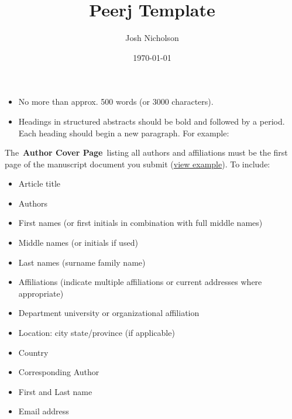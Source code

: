 \documentclass[10pt]{article}
\renewenvironment{abstract}
  {{\bfseries\noindent{\abstractname}\par\nobreak}\footnotesize}
  {\bigskip}
\providecommand{\tightlist}{\setlength{\itemsep}{0pt}\setlength{\parskip}{0pt}}%
\begin{document}
\title{Peerj Template}



\author[1]{Josh Nicholson}%
%


\vspace{-1em}



  \date{\today}


\begingroup
\let\center\flushleft
\let\endcenter\endflushleft
\maketitle
\endgroup





\begin{abstract}
\par\null

\begin{itemize}
\tightlist
\item
  No more than approx. 500 words (or 3000 characters).
\item
  Headings in structured abstracts should be bold and followed by a
  period. Each heading should begin a new paragraph. For example:
\end{itemize}%
\end{abstract}%



\sloppy


The~\textbf{Author Cover Page}~listing all authors and affiliations must
be the first page of the manuscript document you submit
(\href{https://peerj.com/about/author-instructions/\#author-cover-page-modal}{view
example}). To include:

\begin{itemize}
\tightlist
\item
  Article title
\item
  Authors
\item
  First names (or first initials in combination with full middle names)
\item
  Middle names (or initials if used)
\item
  Last names (surname family name)
\item
  Affiliations (indicate multiple affiliations or current addresses
  where appropriate)
\item
  Department university or organizational affiliation
\item
  Location: city state/province (if applicable)
\item
  Country
\item
  Corresponding Author
\item
  First and Last name
\item
  Email address
\end{itemize}
\end{document}
